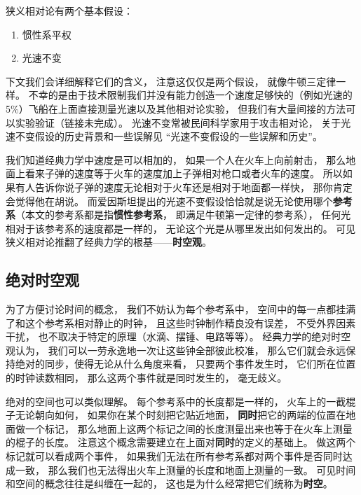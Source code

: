 

狭义相对论有两个基本假设：
\begin{enumerate}
\item 惯性系平权
\item 光速不变
\end{enumerate}
下文我们会详细解释它们的含义， 注意这仅仅是两个假设， 就像牛顿三定律一样。 不幸的是由于技术限制我们并没有能力创造一个速度足够快的（例如光速的 5\%）飞船在上面直接测量光速以及其他相对论实验， 但我们有大量间接的方法可以实验验证（链接未完成）。 光速不变常被民间科学家用于攻击相对论， 关于光速不变假设的历史背景和一些误解见 “光速不变假设的一些误解和历史”。

我们知道经典力学中速度是可以相加的， 如果一个人在火车上向前射击， 那么地面上看来子弹的速度等于火车的速度加上子弹相对枪口或者火车的速度。 所以如果有人告诉你说子弹的速度无论相对于火车还是相对于地面都一样快， 那你肯定会觉得他在胡说。 而爱因斯坦提出的光速不变假设恰恰就是说无论使用哪个\textbf{参考系}（本文的参考系都是指\textbf{惯性参考系}， 即满足牛顿第一定律的参考系）， 任何光相对于该参考系的速度都是一样的， 无论这个光是从哪里发出如何发出的。 可见狭义相对论推翻了经典力学的根基——\textbf{时空观}。

\subsection{绝对时空观} \label{sub_Relat0_1}
为了方便讨论时间的概念， 我们不妨认为每个参考系中， 空间中的每一点都挂满了和这个参考系相对静止的时钟， 且这些时钟制作精良没有误差， 不受外界因素干扰， 也不取决于特定的原理（水滴、摆锤、电路等等）。 经典力学的绝对时空观认为， 我们可以一劳永逸地一次让这些钟全部彼此校准， 那么它们就会永远保持绝对的同步，使得无论从什么角度来看， 只要两个事件发生时， 它们所在位置的时钟读数相同， 那么这两个事件就是同时发生的， 毫无歧义。

绝对的空间也可以类似理解。 每个参考系中的长度都是一样的， 火车上的一截棍子无论朝向如何， 如果你在某个时刻把它贴近地面， \textbf{同时}把它的两端的位置在地面做一个标记， 那么地面上这两个标记之间的长度测量出来也等于在火车上测量的棍子的长度。 注意这个概念需要建立在上面对\textbf{同时}的定义的基础上。 做这两个标记就可以看成两个事件， 如果我们无法在所有参考系都对两个事件是否同时达成一致， 那么我们也无法得出火车上测量的长度和地面上测量的一致。 可见时间和空间的概念往往是纠缠在一起的， 这也是为什么经常把它们统称为\textbf{时空}。

